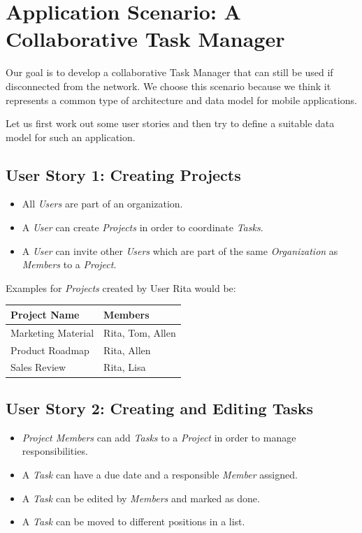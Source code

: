 
\section{Application Scenario: A Collaborative Task Manager}
Our goal is to develop a collaborative Task Manager that can still be used if disconnected from the network.
We choose this scenario because we think it represents a common type of architecture and data model for mobile applications.

Let us first work out some user stories and then try to define a suitable data model for such an application.

\subsection{User Story 1: Creating Projects}
\begin{itemize}
\item All \emph{Users} are part of an organization.
\item A \emph{User} can create \emph{Projects} in order to coordinate \emph{Tasks}.
\item A \emph{User} can invite other \emph{Users} which are part of the same \emph{Organization} as \emph{Members} to a \emph{Project}.
\end{itemize}

Examples for \emph{Projects} created by User Rita would be:\\

\begin{tabular}{ l l }
Project Name & Members \\
\hline
Marketing Material & Rita, Tom, Allen \\
Product Roadmap & Rita, Allen \\
Sales Review & Rita, Lisa
\end{tabular}

\subsection{User Story 2: Creating and Editing Tasks}
\begin{itemize}
\item \emph{Project Members} can add \emph{Tasks} to a \emph{Project} in order to manage responsibilities.
\item A \emph{Task} can have a due date and a responsible \emph{Member} assigned.
\item A \emph{Task} can be edited by \emph{Members} and marked as done.
\item A \emph{Task} can be moved to different positions in a list.
\end{itemize}

